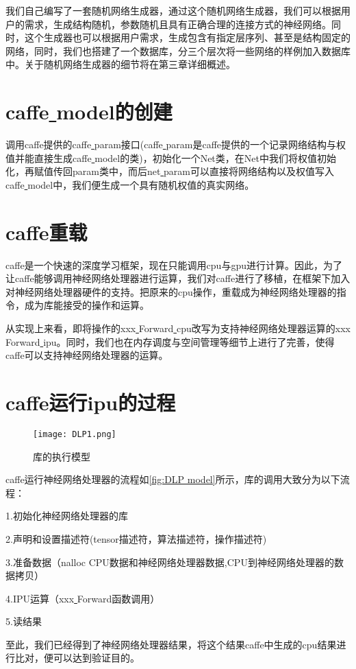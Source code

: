 我们自己编写了一套随机网络生成器，通过这个随机网络生成器，我们可以根据用户的需求，生成结构随机，参数随机且具有正确合理的连接方式的神经网络。同时，这个生成器也可以根据用户需求，生成包含有指定层序列、甚至是结构固定的网络，同时，我们也搭建了一个数据库，分三个层次将一些网络的样例加入数据库中。关于随机网络生成器的细节将在第三章详细概述。
\section{caffe\underline{ }model的创建}
调用caffe提供的caffe\underline{ }param接口(caffe\underline{ }param是caffe提供的一个记录网络结构与权值并能直接生成caffe\underline{ }model的类)，初始化一个Net类，在Net中我们将权值初始化，再赋值传回param类中，而后net\underline{ }param可以直接将网络结构以及权值写入caffe\underline{ }model中，我们便生成一个具有随机权值的真实网络。

\section{caffe重载}
caffe是一个快速的深度学习框架，现在只能调用cpu与gpu进行计算。因此，为了让caffe能够调用神经网络处理器进行运算，我们对caffe进行了移植，在框架下加入对神经网络处理器硬件的支持。把原来的cpu操作，重载成为神经网络处理器的指令，成为库能接受的操作和运算。

从实现上来看，即将操作的xxx\underline{ }Forward\underline{ }cpu改写为支持神经网络处理器运算的xxx\underline{ }Forward\underline{ }ipu。同时，我们也在内存调度与空间管理等细节上进行了完善，使得caffe可以支持神经网络处理器的运算。

\section{caffe运行ipu的过程}
\begin{figure}[!htbp]
\centering
\texttt{[image: DLP1.png]}
\caption{库的执行模型}
\label{fig:DLP model}
\end{figure}
caffe运行神经网络处理器的流程如\autoref{fig:DLP model}所示，库的调用大致分为以下流程：

1.初始化神经网络处理器的库

2.声明和设置描述符(tensor描述符，算法描述符，操作描述符)

3.准备数据（nalloc CPU数据和神经网络处理器数据,CPU到神经网络处理器的数据拷贝）

4.IPU运算（xxx\underline{ }Forward函数调用）

5.读结果

至此，我们已经得到了神经网络处理器结果，将这个结果caffe中生成的cpu结果进行比对，便可以达到验证目的。
